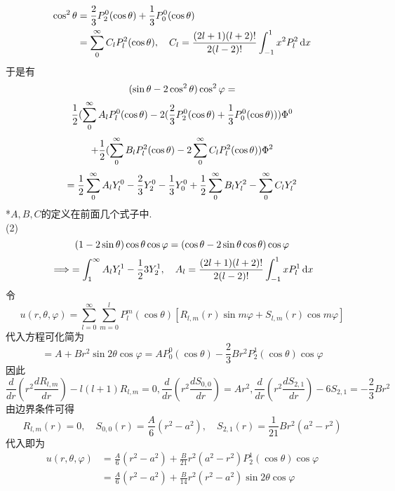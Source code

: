 \documentclass[UTF8,9pt]{ctexart}
\begin{document}
$$\begin{aligned} 
    \cos^2\theta &= \frac{2}{3}P_2^0(\cos\theta)+\frac{1}{3}P_0^0(\cos\theta)\\
    &= \sum_0^\infty C_lP_l^2(\cos\theta),\quad C_l=\frac{(2l+1)(l+2)!}{2(l-2)!}\int_{-1}^1x^2P_l^2\mathop{}\!\mathrm{d} x
 \end{aligned}$$
于是有
$$(\sin \theta-2\cos^2\theta)\cos^2\varphi = $$
$$\frac{1}{2}(\sum_0^\infty A_lP_l^0(\cos\theta)-2(\frac{2}{3}P_2^0(\cos\theta)+\frac{1}{3}P_0^0(\cos\theta)))\Phi^0$$
$$+\frac{1}{2}(\sum_0^\infty B_lP_l^2(\cos\theta)-2\sum_0^\infty C_lP_l^2(\cos\theta))\Phi^2$$
$$ = \frac{1}{2}\sum_0^\infty A_lY_l^0-\frac{2}{3}Y^0_2-\frac{1}{3}Y_0^0+\frac{1}{2}\sum_0^\infty B_lY_l^2-\sum_0^\infty C_lY_l^2$$
*$A,B,C$的定义在前面几个式子中. \\
(2)\\
$$(1-2\sin\theta)\cos\theta\cos\varphi=(\cos\theta-2\sin\theta\cos\theta)\cos\varphi$$
$$\implies = \int_1^\infty A_lY_l^1-\frac{1}{2}{3}Y_2^1 ,\quad A_l=\frac{(2l+1)(l+2)!}{2(l-2)!}\int_{-1}^1xP_l^1\mathop{}\!\mathrm{d} x$$
令$$ 
u(r, \theta, \varphi)=\sum_{l=0}^{\infty} \sum_{m=0}^{l} P_{l}^{m}(\cos \theta)\left[R_{l, m}(r) \sin m \varphi+S_{l, m}(r) \cos m \varphi\right]
 $$代入方程可化简为$$ 
 =A+B r^{2} \sin 2 \theta \cos \varphi=A P_{0}^{0}(\cos \theta)-\frac{2}{3} B r^{2} P_{2}^{1}(\cos \theta) \cos \varphi
  $$因此$$ 
  \frac{d}{d r}\left(r^{2} \frac{d R_{l, m}}{d r}\right)-l(l+1) R_{l, m}=0, \frac{d}{d r}\left(r^{2} \frac{d S_{0,0}}{d r}\right)=A r^{2}, \frac{d}{d r}\left(r^{2} \frac{d S_{2,1}}{d r}\right)-6 S_{2,1}=-\frac{2}{3} B r^{2}
   $$
   由边界条件可得$$ 
   R_{l, m}(r)=0, \quad S_{0,0}(r)=\frac{A}{6}\left(r^{2}-a^{2}\right), \quad S_{2,1}(r)=\frac{1}{21} B r^{2}\left(a^{2}-r^{2}\right)
    $$代入即为$$ 
   \begin{aligned} u(r, \theta, \varphi) &=\frac{A}{6}\left(r^{2}-a^{2}\right)+\frac{B}{21} r^{2}\left(a^{2}-r^{2}\right) P_{2}^{1}(\cos \theta) \cos \varphi \\ &=\frac{A}{6}\left(r^{2}-a^{2}\right)+\frac{B}{14} r^{2}\left(r^{2}-a^{2}\right) \sin 2 \theta \cos \varphi \end{aligned}
    $$
\end{document}
